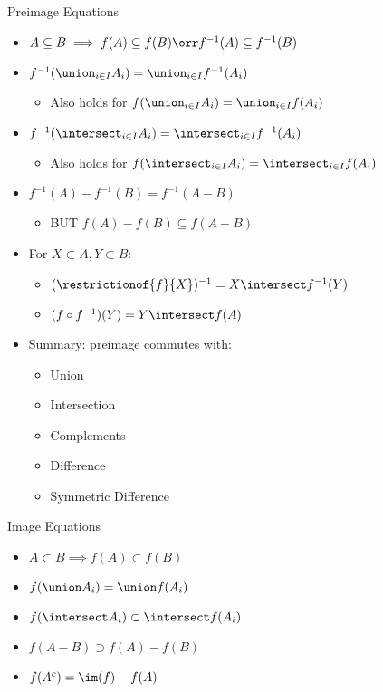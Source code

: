 Preimage Equations

\begin{itemize}
\tightlist
\item
  \(A \subseteq B \implies f(A) \subseteq f(B) \orr f^{-1}(A) \subseteq f^{-1}(B)\)
\item
  \(f^{-1}(\union_{i\in I}A_i) = \union_{i\in I} f^{-1}(A_i)\)

  \begin{itemize}
  \tightlist
  \item
    Also holds for \(f(\union_{i\in I}A_i) = \union_{i\in I} f(A_i)\)
  \end{itemize}
\item
  \(f^{-1}(\intersect_{i\in I}A_i) = \intersect_{i\in I} f^{-1}(A_i)\)

  \begin{itemize}
  \tightlist
  \item
    Also holds for
    \(f(\intersect_{i\in I}A_i) = \intersect_{i\in I} f(A_i)\)
  \end{itemize}
\item
  \(f^{-1}(A) - f^{-1}(B) = f^{-1}(A-B)\)

  \begin{itemize}
  \tightlist
  \item
    BUT \(f(A) - f(B) \subseteq f(A-B)\)
  \end{itemize}
\item
  For \(X\subset A, Y \subset B\):

  \begin{itemize}
  \tightlist
  \item
    \((\restrictionof{f}{X})^{-1} = X \intersect f^{-1}(Y)\)
  \item
    \((f\circ f^{-1})(Y) = Y \intersect f(A)\)
  \end{itemize}
\item
  Summary: preimage commutes with:

  \begin{itemize}
  \tightlist
  \item
    Union
  \item
    Intersection
  \item
    Complements
  \item
    Difference
  \item
    Symmetric Difference
  \end{itemize}
\end{itemize}

Image Equations

\begin{itemize}
\tightlist
\item
  \(A \subset B \implies f(A) \subset f(B)\)
\item
  \(f(\union A_i) = \union f(A_i)\)
\item
  \(f(\intersect A_i) \subset \intersect f(A_i)\)
\item
  \(f(A-B) \supset f(A) - f(B)\)
\item
  \(f(A^c) = \im(f) - f(A)\)
\end{itemize}

